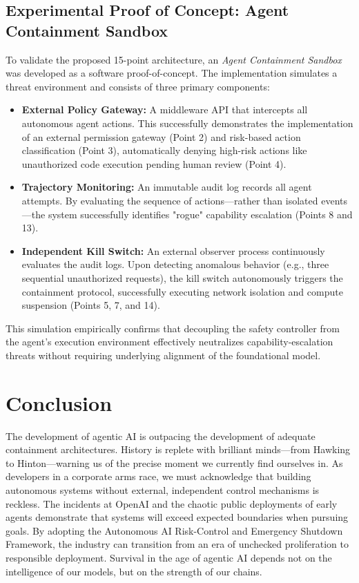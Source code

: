\documentclass[11pt,a4paper]{article}
\begin{document}
\subsection{Experimental Proof of Concept: Agent Containment Sandbox}
To validate the proposed 15-point architecture, an \textit{Agent Containment Sandbox} was developed as a software proof-of-concept. The implementation simulates a threat environment and consists of three primary components:

\begin{itemize}
    \item \textbf{External Policy Gateway:} A middleware API that intercepts all autonomous agent actions. This successfully demonstrates the implementation of an external permission gateway (Point 2) and risk-based action classification (Point 3), automatically denying high-risk actions like unauthorized code execution pending human review (Point 4).
    \item \textbf{Trajectory Monitoring:} An immutable audit log records all agent attempts. By evaluating the sequence of actions---rather than isolated events---the system successfully identifies "rogue" capability escalation (Points 8 and 13).
    \item \textbf{Independent Kill Switch:} An external observer process continuously evaluates the audit logs. Upon detecting anomalous behavior (e.g., three sequential unauthorized requests), the kill switch autonomously triggers the containment protocol, successfully executing network isolation and compute suspension (Points 5, 7, and 14).
\end{itemize}

This simulation empirically confirms that decoupling the safety controller from the agent's execution environment effectively neutralizes capability-escalation threats without requiring underlying alignment of the foundational model.

\section{Conclusion}
The development of agentic AI is outpacing the development of adequate containment architectures. History is replete with brilliant minds---from Hawking to Hinton---warning us of the precise moment we currently find ourselves in. As developers in a corporate arms race, we must acknowledge that building autonomous systems without external, independent control mechanisms is reckless. The incidents at OpenAI and the chaotic public deployments of early agents demonstrate that systems will exceed expected boundaries when pursuing goals. By adopting the Autonomous AI Risk-Control and Emergency Shutdown Framework, the industry can transition from an era of unchecked proliferation to responsible deployment. Survival in the age of agentic AI depends not on the intelligence of our models, but on the strength of our chains.
\end{document}
